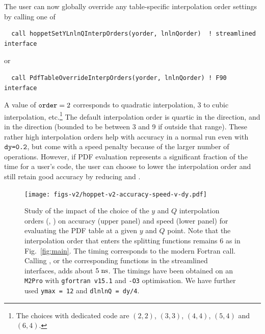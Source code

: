The user can now globally override any table-specific interpolation order
settings by calling one of
\begin{lstlisting}
  call hoppetSetYLnlnQInterpOrders(yorder, lnlnQorder)  ! streamlined interface
\end{lstlisting}
or
\begin{lstlisting}
  call PdfTableOverrideInterpOrders(yorder, lnlnQorder) ! F90 interface
\end{lstlisting}
A value of $\texttt{order}=2$ corresponds to quadratic interpolation, $3$ to
cubic interpolation, etc.\footnote{The 
  choices with dedicated code are $(2,2)$, $(3,3)$, $(4,4)$, $(5,4)$
  and $(6,4)$.}
%
The default interpolation order is quartic in the 
direction, and  in the  direction (bounded
to be between 3 and 9 if outside that range).
%
These rather high interpolation orders help with accuracy in a normal
\hoppet{} run even with $\texttt{dy=0.2}$, but come with a speed penalty
because of the larger number of operations.
%
However, if PDF evaluation represents a significant fraction of the
time for a user's code, the user can choose to lower the interpolation
order and still retain good accuracy by reducing  and
.

\begin{figure}[tbp]
    \centering
        \texttt{[image: figs-v2/hoppet-v2-accuracy-speed-v-dy.pdf]}
    \caption{
      Study of the impact of the choice of the $y$ and $Q$ interpolation
      orders (, ) on accuracy (upper panel) and speed
      (lower panel) for evaluating
      the PDF table at a given $y$ and $Q$ point.
      Note that the interpolation order that enters the splitting
      functions remains $6$ as in Fig.~\ref{fig:main}.
      The timing corresponds to the  modern
      Fortran call.
      Calling , or the corresponding
      functions in the streamlined interfaces, adds about $5\;\mathrm{ns}$.
      The timings have been
      obtained on an \texttt{M2Pro} with \texttt{gfortran v15.1} and
      \texttt{-O3} optimisation.
      We have further used \texttt{ymax = 12} and
      \texttt{dlnlnQ = dy/4}.
      }
        \label{fig:interp-accuracy}
\end{figure}


